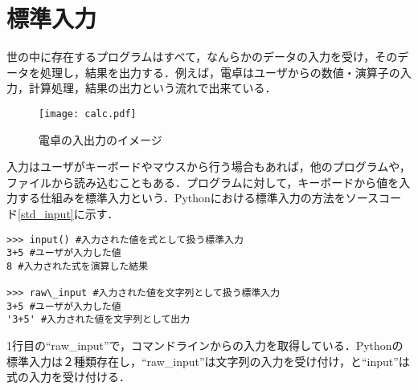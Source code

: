 \section{標準入力}
世の中に存在するプログラムはすべて，なんらかのデータの入力を受け，そのデータを処理し，結果を出力する．例えば，電卓はユーザからの数値・演算子の入力，計算処理，結果の出力という流れで出来ている．


\begin{figure}[htbp]
\begin{center}
\texttt{[image: calc.pdf]}
\caption{電卓の入出力のイメージ}
\label{fig:fig2}
\end{center}
\end{figure}


入力はユーザがキーボードやマウスから行う場合もあれば，他のプログラムや，ファイルから読み込むこともある．プログラムに対して，キーボードから値を入力する仕組みを標準入力という．Pythonにおける標準入力の方法をソースコード\ref{std_input}に示す．


\begin{lstlisting}[caption=標準入力,label=std_input]
>>> input() #入力された値を式として扱う標準入力
3+5 #ユーザが入力した値
8 #入力された式を演算した結果

>>> raw\_input #入力された値を文字列として扱う標準入力
3+5 #ユーザが入力した値
'3+5' #入力された値を文字列として出力
\end{lstlisting}


1行目の``raw\_input''で，コマンドラインからの入力を取得している．Pythonの標準入力は２種類存在し，``raw\_input''は文字列の入力を受け付け，と``input''は式の入力を受け付ける．